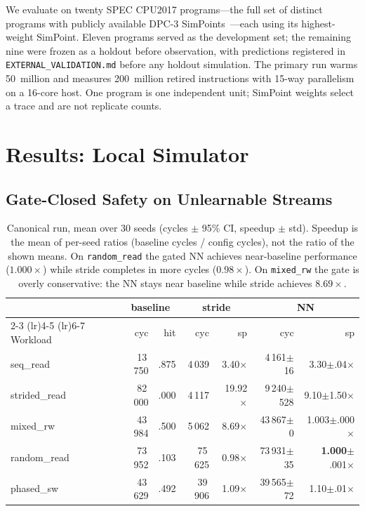 \documentclass[conference]{IEEEtran}
\begin{document}
We evaluate on twenty SPEC CPU2017 programs---the full set of distinct
programs with publicly available DPC-3 SimPoints~\cite{dpc3}---each using
its highest-weight SimPoint. Eleven programs served as the development set;
the remaining nine were frozen as a holdout before observation, with
predictions registered in \texttt{EXTERNAL\_VALIDATION.md} before any
holdout simulation. The primary run warms 50~million and measures
200~million retired instructions with 15-way parallelism on a 16-core host.
One program is one independent unit; SimPoint weights select a trace and are
not replicate counts.

\section{Results: Local Simulator}
\label{sec:local_results}

\subsection{Gate-Closed Safety on Unlearnable Streams}

\begin{table}[t]
\centering
\caption{Canonical run, mean over 30 seeds (cycles $\pm$ 95\% CI, speedup
$\pm$ std). Speedup is the mean of per-seed ratios (baseline cycles / config
cycles), not the ratio of the shown means.
On \texttt{random\_read} the gated NN achieves near-baseline
performance ($1.000\times$) while stride completes in more cycles
($0.98\times$). On \texttt{mixed\_rw} the gate is overly conservative:
the NN stays near baseline while stride achieves $8.69\times$.}
\label{tab:canonical}
\footnotesize
\setlength{\tabcolsep}{3pt}
\begin{tabular}{@{}l rr rr rr@{}}
\toprule
& \multicolumn{2}{c}{baseline} & \multicolumn{2}{c}{stride} & \multicolumn{2}{c}{NN} \\
\cmidrule(lr){2-3} \cmidrule(lr){4-5} \cmidrule(lr){6-7}
Workload & cyc & hit & cyc & sp & cyc & sp \\
\midrule
seq\_read     & 13\,750 & .875 & 4\,039 & 3.40$\times$ & 4\,161$\pm$16 & 3.30$\pm$.04$\times$ \\
strided\_read & 82\,000 & .000 & 4\,117 & 19.92$\times$ & 9\,240$\pm$528 & 9.10$\pm$1.50$\times$ \\
mixed\_rw     & 43\,984 & .500 & 5\,062 & 8.69$\times$ & 43\,867$\pm$0 & 1.003$\pm$.000$\times$ \\
random\_read  & 73\,952 & .103 & 75\,625 & 0.98$\times$ & 73\,931$\pm$35 & \textbf{1.000}$\pm$.001$\times$ \\
phased\_sw    & 43\,629 & .492 & 39\,906 & 1.09$\times$ & 39\,565$\pm$72 & 1.10$\pm$.01$\times$ \\
\bottomrule
\end{tabular}
\end{table}
\end{document}
